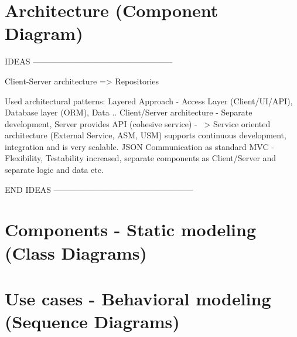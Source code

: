 \documentclass[a4paper,11pt]{article}
\begin{document}
\section{Architecture (Component Diagram)}

IDEAS ---------------------------------------------------

Client-Server architecture => Repositories
	

Used architectural patterns:
Layered Approach 
	- Access Layer (Client/UI/API), Database layer (ORM), Data .. 
Client/Server architecture
	- Separate development, Server provides API (cohesive service)
	- ~> Service oriented architecture (External Service, ASM, USM) supports continuous development, integration and is very scalable. JSON Communication as standard
MVC 
	- Flexibility, Testability increased, separate components as Client/Server and separate logic and data etc.

END IDEAS ---------------------------------------------------

\section{Components - Static modeling (Class Diagrams)}

\section{Use cases - Behavioral modeling (Sequence Diagrams)}
\end{document}

